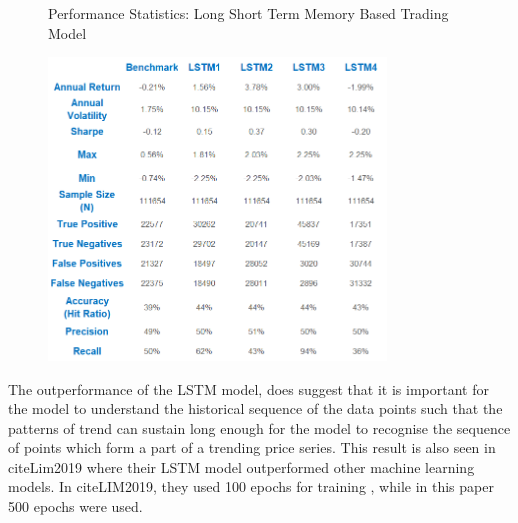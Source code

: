 \documentclass[11pt]{article}
\begin{document}
\begin{figure}[h]
    \centering
	\caption{Performance Statistics: Long Short Term Memory Based Trading Model}    
	\includegraphics[width=0.8\textwidth]{LSTMRandomDataStatsv2}
    \label{fig:LSTMRandomDataStats}
     \caption*{}
\end{figure}

The outperformance of the LSTM model, does suggest that it is important for the model to understand the historical sequence of the data points such that the patterns of trend can sustain long enough for the model to recognise the sequence of points which form a part of a trending price series. This result is also seen in citeLim2019 where their LSTM model outperformed other machine learning models. In citeLIM2019, they used 100 epochs for training , while in this paper 500 epochs were used.
\end{document}
